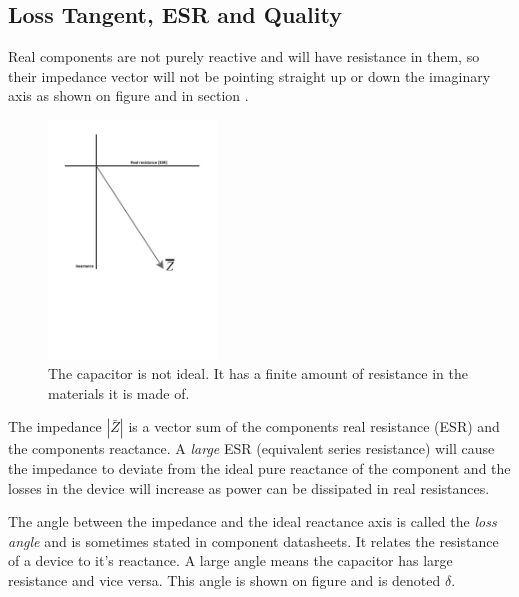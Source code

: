 \subsection{Loss Tangent, ESR and Quality} \label{subsec:LossTangent}

Real components are not purely reactive and will have resistance in them, so their impedance vector will not be pointing straight up or down the imaginary axis as shown on figure  and in section .

\begin{figure}[H]
    \centering
    \includegraphics[clip, trim=0 250 0 0, width=0.4\textwidth]{Sections/4_TechnicalAnalysis/Figures/4_1_4_LossTangent1.pdf}
    \caption{The capacitor is not ideal. It has a finite amount of resistance in the materials it is made of.}
    \label{fig:4_1_1_LossTangent1}
\end{figure}

The impedance $|\bar Z|$ is a vector sum of the components real resistance (ESR) and the components reactance. A \textit{large} ESR (equivalent series resistance) will cause the impedance to deviate from the ideal pure reactance of the component and the losses in the device will increase as power can be dissipated in real resistances.

The angle between the impedance and the ideal reactance axis is called the \textit{loss angle} and is sometimes stated in component datasheets. It relates the resistance of a device to it's reactance. A large angle means the capacitor has large resistance and vice versa. This angle is shown on figure and is denoted $\delta$.

